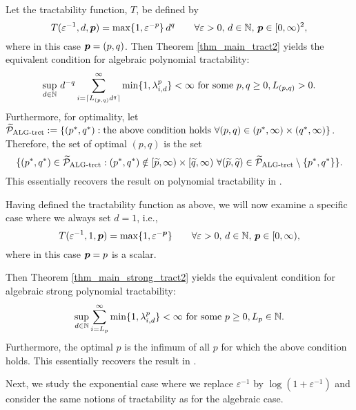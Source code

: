 \documentclass[sort&compress]{elsarticle}
\begin{document}
\begin{example}
Let the tractability function, $T$,
be defined by
\[
 T(\varepsilon^{-1},d,\boldsymbol{p})= \max\{1,\varepsilon^{-p}\}\, d^q
 \qquad \forall \varepsilon > 0, \,  d \in \mathbb{N}, \, \boldsymbol{p} \in [0,\infty)^2,
\] where in this case $\boldsymbol{p} = (p,q)$.
Then Theorem \ref{thm_main_tract2} yields the  equivalent condition for algebraic polynomial tractability:
\[
 \sup_{d\in\mathbb{N}}\, d^{-q} \sum_{i=\lceil L_{(p,q)} d^{q}\rceil}^\infty \min\{1,\lambda_{i,d}^p\}  < \infty \text{ for some } p,q \ge 0, L_{(p,q)} >0.
\]
Furthermore, for optimality, let $\widetilde{\mathcal{P}}_{\textup{ALG-trct}} : = \{(p^*,q^*) : \text{the above condition holds }\forall (p,q) \in (p^*,\infty)\times(q^*,\infty) \}$. Therefore, the set of optimal $(p,q)$ is the set 
\[
    \{(p^*,q^*) \in \widetilde{\mathcal{P}}_{\textup{ALG-trct}} : (p^*,q^*) \notin [\widetilde{p},\infty) \times [\widetilde{q},\infty)\, \, \forall (\widetilde{p},\widetilde{q}) \in \widetilde{\mathcal{P}}_{\textup{ALG-trct}}\setminus \{p^*,q^*\}  \}.
\]
This essentially recovers the result on polynomial tractability in \cite[Theorem 5.1]{NovWoz08a}. 

Having defined the tractability function as above, we will now examine a specific case where we always set $d=1$, i.e.,
\[
T(\varepsilon^{-1},1,\boldsymbol{p})= \max\{1,\varepsilon^{-\boldsymbol{p}}\}\qquad \forall \varepsilon > 0, \,  d \in \mathbb{N}, \, \boldsymbol{p} \in [0,\infty),
\]
where in this case $\boldsymbol{p}=p$ is a scalar. 


Then Theorem \ref{thm_main_strong_tract2} yields the equivalent condition for algebraic strong polynomial tractability:
\[
\sup_{d\in\mathbb{N}} \sum_{i=L_p}^\infty \min\{1,\lambda_{i,d}^p\} < \infty \text{ for some } p \ge 0, L_p \in \mathbb{N}.
\]
Furthermore, the optimal $p$ is the infimum of all $p$ for which the above condition holds. This essentially recovers the result in \cite[Theorem 5.1]{NovWoz08a}.
\end{example}
Next, we study the exponential case where we replace $\varepsilon^{-1}$ by $\log(1+\varepsilon^{-1})$ and consider the same notions of tractability as for the algebraic case.
\end{document}
